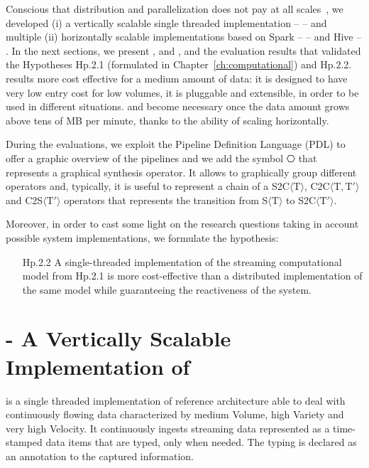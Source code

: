 {Conscious that distribution and parallelization does not pay at all scales~\cite{bodendistributed}, we developed (i) a vertically scalable single threaded implementation -- \sti{} -- and multiple (ii) horizontally scalable implementations based on Spark -- \sparkdi{} -- and Hive -- \hivedi{}.
In the next sections, we present \sti{}, \sparkdi{} and \hivedi{}, and the evaluation results that validated the Hypotheses \textsf{Hp.2.1} (formulated in Chapter~\ref{ch:computational}) and \textsf{Hp.2.2}.
\sti{} results more cost effective for a medium amount of data: it is designed to have very low entry cost for low volumes, it is pluggable and extensible, in order to be used in different situations.
\sparkdi{} and \hivedi{} become necessary once the data amount grows above tens of MB per minute, thanks to the ability of scaling horizontally.

During the evaluations, we exploit the Pipeline Definition Language (PDL) to offer a graphic overview of the pipelines and we add the symbol $\hexagon$ that represents a graphical synthesis operator.
It allows to graphically group different operators and, typically, it is useful to represent a chain of a S2C$\langle\mathrm{T}\rangle$, C2C$\langle\mathrm{T},\mathrm{T}'\rangle$ and C2S$\langle\mathrm{T}'\rangle$ operators that represents the transition from S$\langle\mathrm{T}\rangle$ to S2C$\langle\mathrm{T}'\rangle$.

Moreover, in order to cast some light on the research questions taking in account possible system implementations, we formulate the hypothesis: 
\begin{itemize}[leftmargin=42pt]
\item[\textsf{Hp.2.2}] A single-threaded implementation of the streaming computational model from \textsf{Hp.2.1} is more cost-effective than a distributed implementation of the same model while guaranteeing the reactiveness of the system.
\end{itemize}

}

\section{\sti{} - A Vertically Scalable Implementation of \texorpdfstring{\protect\river{}}{RIVER}} \label{sec:comp-mod-impl-v}
\sti{} is a single threaded implementation of \river{} reference architecture able to deal with continuously flowing data characterized by medium Volume, high Variety and very high Velocity. 
It continuously ingests streaming data represented as a time-stamped data items that are typed, only when needed. The typing is declared as an annotation to the captured information.

